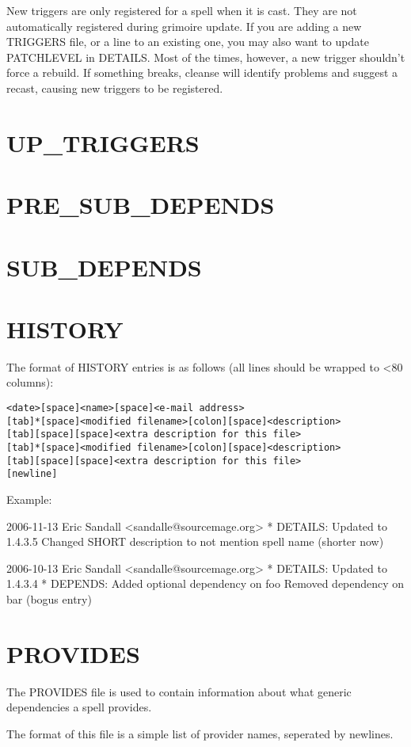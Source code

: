 \documentclass[a4paper,10pt]{book}
\begin{document}
New triggers are only registered for a spell when it is cast. They are not
automatically registered during grimoire update. If you are adding a new
TRIGGERS file, or a line to an existing one, you may also want to update
PATCHLEVEL in DETAILS. Most of the times, however, a new trigger shouldn't
force a rebuild. If something breaks, cleanse will identify problems and
suggest a recast, causing new triggers to be registered.

\section{UP\_TRIGGERS}
\section{PRE\_SUB\_DEPENDS}
\section{SUB\_DEPENDS}
\section{HISTORY}
The format of HISTORY entries is as follows (all lines should be wrapped
to <80 columns):
\begin{verbatim}
<date>[space]<name>[space]<e-mail address>
[tab]*[space]<modified filename>[colon][space]<description>
[tab][space][space]<extra description for this file>
[tab]*[space]<modified filename>[colon][space]<description>
[tab][space][space]<extra description for this file>
[newline]
\end{verbatim}

Example:
\begin{verbatim*}
2006-11-13 Eric Sandall <sandalle@sourcemage.org>
	* DETAILS: Updated to 1.4.3.5
	  Changed SHORT description to not mention spell name (shorter now)

2006-10-13 Eric Sandall <sandalle@sourcemage.org>
	* DETAILS: Updated to 1.4.3.4
	* DEPENDS: Added optional dependency on foo
	  Removed dependency on bar (bogus entry)
\end{verbatim*}

\section{PROVIDES}
The PROVIDES file is used to contain information about what generic
dependencies a spell provides.

The format of this file is a simple list of provider names, seperated by
newlines.
\end{document}
